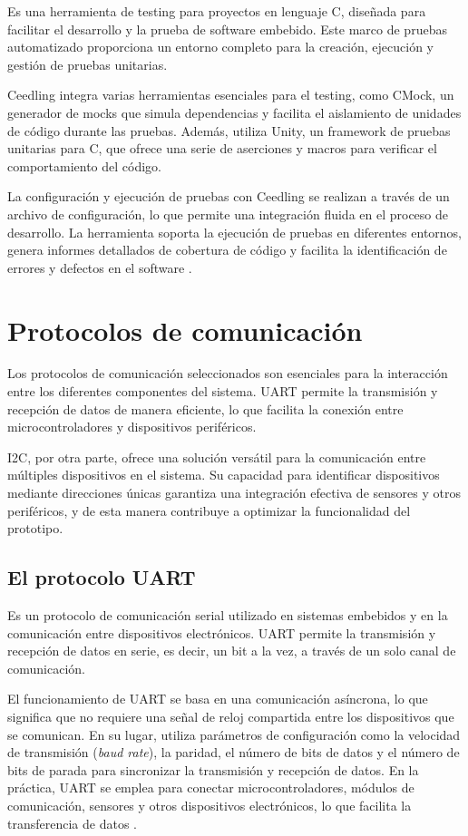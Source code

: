 Es una herramienta de testing para proyectos en lenguaje C, diseñada para facilitar el desarrollo y la prueba de software embebido. Este marco de pruebas automatizado proporciona un entorno completo para la creación, ejecución y gestión de pruebas unitarias.

Ceedling integra varias herramientas esenciales para el testing, como CMock, un generador de mocks que simula dependencias y facilita el aislamiento de unidades de código durante las pruebas. Además, utiliza Unity, un framework de pruebas unitarias para C, que ofrece una serie de aserciones y macros para verificar el comportamiento del código.

La configuración y ejecución de pruebas con Ceedling se realizan a través de un archivo de configuración, lo que permite una integración fluida en el proceso de desarrollo. La herramienta soporta la ejecución de pruebas en diferentes entornos, genera informes detallados de cobertura de código y facilita la identificación de errores y defectos en el software \citep{WEBSITE:CEEDLING}.

\section{Protocolos de comunicación}

Los protocolos de comunicación seleccionados son esenciales para la interacción entre los diferentes componentes del sistema. UART permite la transmisión y recepción de datos de manera eficiente, lo que facilita la conexión entre microcontroladores y dispositivos periféricos.

I2C, por otra parte, ofrece una solución versátil para la comunicación entre múltiples dispositivos en el sistema. Su capacidad para identificar dispositivos mediante direcciones únicas garantiza una integración efectiva de sensores y otros periféricos, y de esta manera contribuye a optimizar la funcionalidad del prototipo.

\subsection{El protocolo UART}
\label{subsec:UART}

Es un protocolo de comunicación serial utilizado en sistemas embebidos y en la comunicación entre dispositivos electrónicos. UART permite la transmisión y recepción de datos en serie, es decir, un bit a la vez, a través de un solo canal de comunicación.

El funcionamiento de UART se basa en una comunicación asíncrona, lo que significa que no requiere una señal de reloj compartida entre los dispositivos que se comunican. En su lugar, utiliza parámetros de configuración como la velocidad de transmisión (\textit{baud rate}), la paridad, el número de bits de datos y el número de bits de parada para sincronizar la transmisión y recepción de datos. En la práctica, UART se emplea para conectar microcontroladores, módulos de comunicación, sensores y otros dispositivos electrónicos, lo que facilita la transferencia de datos \citep{WEBSITE:uart}. 

